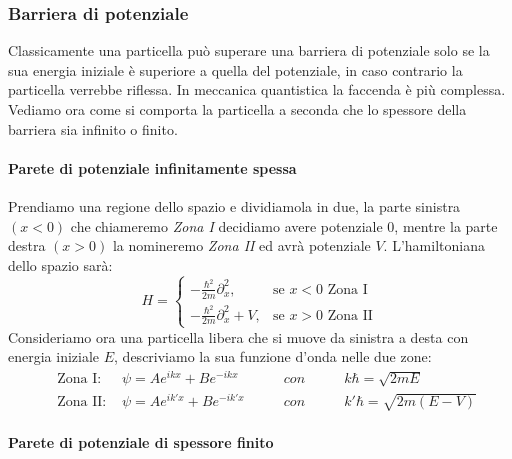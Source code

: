 \subsubsection{Barriera di potenziale}
Classicamente una particella può superare una barriera di potenziale solo se la sua energia iniziale è superiore a quella del potenziale, in caso contrario la particella verrebbe riflessa. In meccanica quantistica la faccenda è più complessa. Vediamo ora come si comporta la particella a seconda che lo spessore della barriera sia infinito o finito.

\paragraph{Parete di potenziale infinitamente spessa}
Prendiamo una regione dello spazio e dividiamola in due, la parte sinistra $(x < 0)$ che chiameremo \textit{Zona I} decidiamo avere potenziale $0$, mentre la parte destra $(x > 0)$ la nomineremo \textit{Zona II} ed avrà potenziale $V$. L'hamiltoniana dello spazio sarà:
$$H=\begin{cases} - \frac{\hbar^2}{2m} \partial_x^2, & \mbox{se } x<0 \mbox{ Zona I} \\ - \frac{\hbar^2}{2m} \partial_x^2 + V, & \mbox{se } x>0 \mbox{ Zona II}
\end{cases}$$
Consideriamo ora una particella libera che si muove da sinistra a desta con energia iniziale $E$, descriviamo la sua funzione d'onda nelle due zone:
\begin{equation}
\begin{aligned}
  \quad \mbox{Zona I: }  &\psi = Ae^{ikx} + Be^{-ikx} \qquad & con \qquad & k\hbar = \sqrt{2mE}\\
  \quad \mbox{Zona II: } &\psi = Ae^{ik'x} + Be^{-ik'x} \qquad & con \qquad & k'\hbar = \sqrt{2m(E-V)}
\end{aligned}
\end{equation}

\paragraph{Parete di potenziale di spessore finito}


